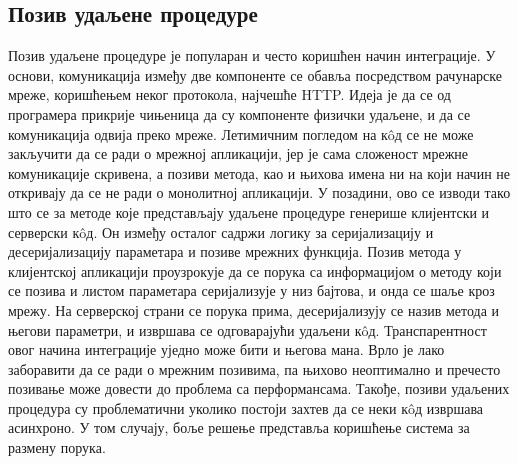 \documentclass[12pt,oneside]{memoir}
\begin{document}
\subsection{Позив удаљене процедуре}
Позив удаљене процедуре је популаран и често коришћен начин интеграције. У основи, комуникација између две компоненте се обавља посредством рачунарске мреже, коришћењем неког протокола, најчешће HTTP. Идеја је да се од програмера прикрије чињеница да су компоненте физички удаљене, и да се комуникација одвија преко мреже. Летимичним погледом на кôд се не може закључити да се ради о мрежној апликацији, јер је сама сложеност мрежне комуникације скривена, а позиви метода, као и њихова имена ни на који начин не откривају да се не ради о монолитној апликацији. У позадини, ово се изводи тако што се за методе које представљају удаљене процедуре генерише клијентски и серверски кôд. Он између осталог садржи логику за серијализацију и десеријализацију параметара и позиве мрежних функција. Позив метода у клијентској апликацији проузрокује да се порука са информацијом о методу који се позива и листом параметара серијализује у низ бајтова, и онда се шаље кроз мрежу. На серверској страни се порука прима, десеријализују се назив метода и његови параметри, и извршава се одговарајући удаљени кôд. Транспарентност овог начина интеграције уједно може бити и његова мана. Врло је лако заборавити да се ради о мрежним позивима, па њихово неоптимално и пречесто позивање може довести до проблема са перформансама. Такође, позиви удаљених процедура су проблематични уколико постоји захтев да се неки кôд извршава асинхроно. У том случају, боље решење представља коришћење система за размену порука.
\end{document}
